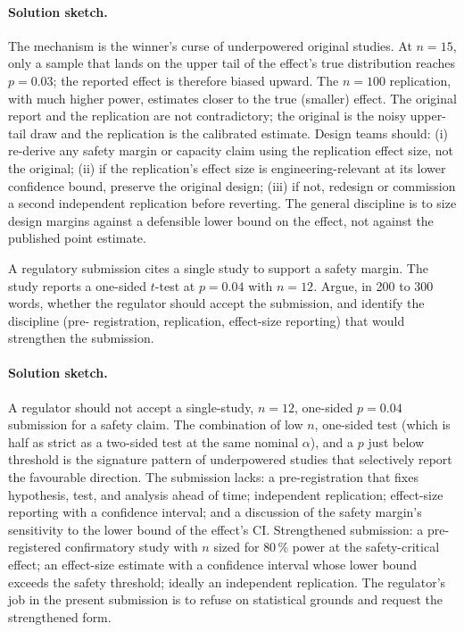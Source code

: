 \paragraph{Solution sketch.}
The mechanism is the winner's curse of underpowered original
studies. At $n = 15$, only a sample that lands on the upper tail
of the effect's true distribution reaches $p = 0.03$; the
reported effect is therefore biased upward. The $n = 100$
replication, with much higher power, estimates closer to the true
(smaller) effect. The original report and the replication are not
contradictory; the original is the noisy upper-tail draw and the
replication is the calibrated estimate. Design teams should: (i)
re-derive any safety margin or capacity claim using the replication
effect size, not the original; (ii) if the replication's effect
size is engineering-relevant at its lower confidence bound,
preserve the original design; (iii) if not, redesign or commission
a second independent replication before reverting. The general
discipline is to size design margins against a defensible lower
bound on the effect, not against the published point estimate.

\begin{exercise}
A regulatory submission cites a single study to support a safety
margin. The study reports a one-sided $t$-test at $p = 0.04$ with
$n = 12$. Argue, in 200 to 300 words, whether the regulator should
accept the submission, and identify the discipline (pre-
registration, replication, effect-size reporting) that would
strengthen the submission.
\end{exercise}

\paragraph{Solution sketch.}
A regulator should not accept a single-study, $n = 12$, one-sided
$p = 0.04$ submission for a safety claim. The combination of low
$n$, one-sided test (which is half as strict as a two-sided test
at the same nominal $\alpha$), and a $p$ just below threshold is
the signature pattern of underpowered studies that selectively
report the favourable direction. The submission lacks: a
pre-registration that fixes hypothesis, test, and analysis ahead
of time; independent replication; effect-size reporting with a
confidence interval; and a discussion of the safety margin's
sensitivity to the lower bound of the effect's CI. Strengthened
submission: a pre-registered confirmatory study with $n$ sized for
$80 \,\%$ power at the safety-critical effect; an effect-size
estimate with a confidence interval whose lower bound exceeds the
safety threshold; ideally an independent replication. The
regulator's job in the present submission is to refuse on
statistical grounds and request the strengthened form.

